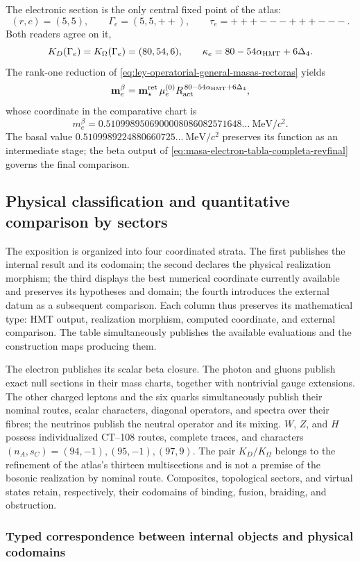 The electronic section is the only central fixed point of the atlas:
\begin{equation}
 (r,c)=(5,5),\qquad
 \Gamma_e=(5,5,++),\qquad
 \tau_e=\mathtt{+++---+++---}.
 \label{eq:ruta-electronica-central-masas-rectoras}
\end{equation}
Both readers agree on it,
\begin{equation}
 K_D(\Gamma_e)=K_\Omega(\Gamma_e)=(80,54,6),\qquad
 \kappa_e=80-54\alpha_{\rm HMT}+6\Delta_4.
 \label{eq:kappa-electron-rector}
\end{equation}
The rank-one reduction of
\eqref{eq:ley-operatorial-general-masas-rectoras} yields
\begin{equation}
 \mathbf m_e^\beta
 =\mathbf m_\star^{\rm ret}\,
   \mu_e^{(0)}R_{\rm act}^{\,80-54\alpha_{\rm HMT}+6\Delta_4},
 \label{eq:electron-rank1-ley-masas}
\end{equation}
whose coordinate in the comparative chart is
\begin{equation}
 \boxed{m_e^\beta
 =0.5109989506900008086082571648\ldots\ \mathrm{MeV}/c^2.}
 \label{eq:masa-electron-tabla-completa-revfinal}
\end{equation}
The basal value
\(0.5109989224880660725\ldots\ \mathrm{MeV}/c^2\) preserves its function as an
intermediate stage; the beta output of
\eqref{eq:masa-electron-tabla-completa-revfinal} governs the final comparison.

\subsection{Physical classification and quantitative comparison by sectors}

The exposition is organized into four coordinated strata. The first publishes the
internal result and its codomain; the second declares the physical realization
morphism; the third displays the best numerical coordinate currently available and preserves
its hypotheses and domain; the fourth introduces the external datum as a subsequent comparison.
Each column thus preserves its mathematical type: HMT output, realization
morphism, computed coordinate, and external comparison. The table simultaneously publishes
the available evaluations and the construction maps producing them.

The electron publishes its scalar beta closure. The photon and gluons publish exact null sections in their mass charts, together with nontrivial gauge extensions. The other charged leptons and the six quarks simultaneously publish their nominal routes, scalar characters, diagonal operators, and spectra over their fibres; the neutrinos publish the neutral operator and its mixing. \(W\), \(Z\), and \(H\) possess individualized CT--108 routes, complete traces, and characters \((n_A,s_C)=(94,-1),(95,-1),(97,9)\). The pair \(K_D/K_\Omega\) belongs to the refinement of the atlas's thirteen multisections and is not a premise of the bosonic realization by nominal route. Composites, topological sectors, and virtual states retain, respectively, their codomains of binding, fusion, braiding, and obstruction.

\subsubsection{Typed correspondence between internal objects and physical codomains}

